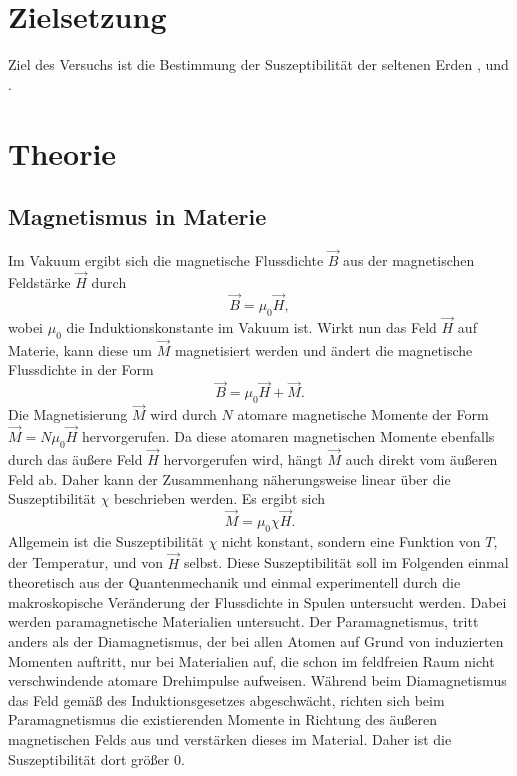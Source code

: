 \section{Zielsetzung}
Ziel des Versuchs ist die Bestimmung der Suszeptibilität der seltenen Erden
, und .
\section{Theorie}
\label{sec:Theorie}
\subsection{Magnetismus in Materie}
Im Vakuum ergibt sich die magnetische Flussdichte $\vec{B}$ aus der magnetischen Feldstärke $\vec{H}$
durch 
\begin{equation*}
    \vec{B}= \mu_0 \vec{H},
    \label{eq:BVakuum}
\end{equation*}
wobei $\mu_0$ die Induktionskonstante im Vakuum ist.
Wirkt nun das Feld $\vec{H}$ auf Materie, kann diese um $\vec{M}$ magnetisiert werden und ändert
die magnetische Flussdichte in der Form
\begin{equation*}
    \vec{B}= \mu_0 \vec{H}+\vec{M}.
    \label{eq:BMaterie}
\end{equation*}
Die Magnetisierung $\vec{M}$ wird durch $N$ atomare magnetische Momente der Form 
$\vec{M}=N\mu_0 \vec{H}$ hervorgerufen. Da diese atomaren magnetischen Momente ebenfalls durch 
das äußere Feld $\vec{H}$ hervorgerufen wird, hängt $\vec{M}$ auch direkt vom äußeren Feld ab.
Daher kann der Zusammenhang näherungsweise linear über die Suszeptibilität $\chi$ beschrieben werden.
Es ergibt sich
\begin{equation*}
    \vec{M}= \mu_0 \chi \vec{H}.
    \label{eq:MMakro}
\end{equation*}
Allgemein ist die Suszeptibilität $\chi$ nicht konstant, sondern eine Funktion von $T$, der Temperatur, und von $\vec{H}$ selbst.
Diese Suszeptibilität soll im Folgenden einmal theoretisch aus der Quantenmechanik und einmal experimentell
durch die makroskopische Veränderung der Flussdichte in Spulen untersucht werden.
Dabei werden paramagnetische Materialien untersucht. Der Paramagnetismus,
tritt anders als der Diamagnetismus, der bei allen Atomen auf Grund von induzierten Momenten 
auftritt, nur bei Materialien auf, die schon im feldfreien Raum nicht verschwindende atomare
Drehimpulse aufweisen. Während beim Diamagnetismus das Feld gemäß des Induktionsgesetzes abgeschwächt,
richten sich beim Paramagnetismus die existierenden Momente in Richtung des äußeren magnetischen 
Felds aus und verstärken dieses im Material. Daher ist die Suszeptibilität dort größer 0.
